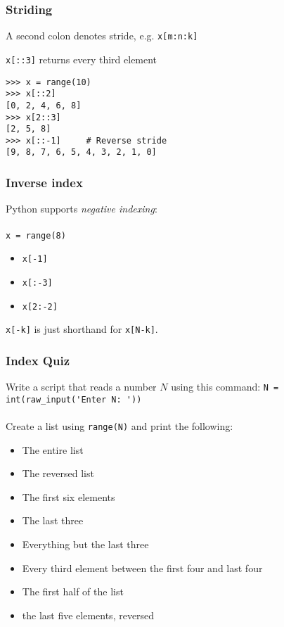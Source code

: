 \documentclass[red]{beamer}
\begin{document}
\begin{frame}[fragile]
    \frametitle{Striding}

    A second colon denotes stride, e.g. \lstinline|x[m:n:k]|

    \lstinline|x[::3]| returns every third element

    \begin{lstlisting}
>>> x = range(10)
>>> x[::2]
[0, 2, 4, 6, 8]
>>> x[2::3]
[2, 5, 8]
>>> x[::-1]     # Reverse stride
[9, 8, 7, 6, 5, 4, 3, 2, 1, 0]
    \end{lstlisting}
\end{frame}
\begin{frame}[fragile]
    \frametitle{Inverse index}

    Python supports \textit{negative indexing}:
    \\~\\
    \lstinline|x = range(8)|
    \begin{itemize}
        \item \lstinline|x[-1]| \\
        \item \lstinline|x[:-3]| \\
        \item \lstinline|x[2:-2]| \\
    \end{itemize}

    \begin{block}{}
        \lstinline|x[-k]| is just shorthand for \lstinline|x[N-k]|.
    \end{block}
\end{frame}
\begin{frame}[fragile]
    \frametitle{Index Quiz}

    Write a script that reads a number $N$ using this command:
    \lstinline|N = int(raw_input('Enter N: '))|
    \\~\\
    Create a list using \lstinline|range(N)| and print the following:
    \begin{itemize}
        \item The entire list
        \item The reversed list
        \item The first six elements
        \item The last three
        \item Everything but the last three
        \item Every third element between the first four and last four
        \item The first half of the list
        \item the last five elements, reversed
    \end{itemize}
\end{frame}
\end{document}
